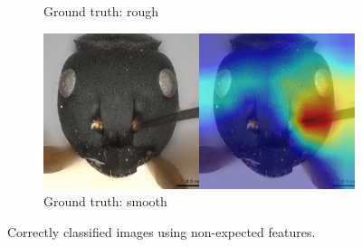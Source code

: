 \documentclass{aci}
\numberwithin{equation}{section}
\begin{document}
\begin{figure}
\begin{subfigure}{\subwidth}
        \caption{Ground truth: rough}
        \label{fig:correct_nonideal_1694}
    \end{subfigure}
    \begin{subfigure}{\subwidth}
        \includegraphics[width=1\linewidth]{thesis_assets/gradcam/correct_nonideal/388.png}
        \caption{Ground truth: smooth}
        \label{fig:correct_nonideal_388}
    \end{subfigure}
    \caption{Correctly classified images using non-expected features.}
    \label{fig:correct_nonideal}
\end{figure}
\end{document}
